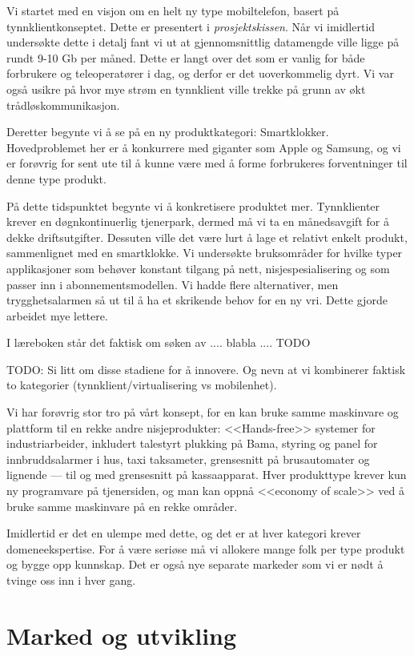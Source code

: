 Vi startet med en visjon om en helt ny type mobiltelefon, basert på
tynnklientkonseptet. Dette er presentert i \textit{prosjektskissen}. Når vi
imidlertid undersøkte dette i detalj fant vi ut at gjennomsnittlig datamengde
ville ligge på rundt 9-10 Gb per måned. Dette er langt over det som er vanlig
for både forbrukere og teleoperatører i dag, og derfor er det uoverkommelig
dyrt. Vi var også usikre på hvor mye strøm en tynnklient ville trekke på grunn
av økt trådløskommunikasjon.

Deretter begynte vi å se på en ny produktkategori: Smartklokker. Hovedproblemet
her er å konkurrere med giganter som Apple og Samsung, og vi er forøvrig for
sent ute til å kunne være med å forme forbrukeres forventninger til denne type
produkt.

På dette tidspunktet begynte vi å konkretisere produktet mer. Tynnklienter
krever en døgnkontinuerlig tjenerpark, dermed må vi ta en månedsavgift for å
dekke driftsutgifter. Dessuten ville det være lurt å lage et relativt enkelt
produkt, sammenlignet med en smartklokke. Vi undersøkte bruksområder for hvilke
typer applikasjoner som behøver konstant tilgang på nett, nisjespesialisering og som passer inn i
abonnementsmodellen. Vi hadde flere alternativer, men trygghetsalarmen så ut
til å ha et skrikende behov for en ny vri. Dette gjorde arbeidet mye lettere.

I læreboken står det faktisk om søken av .... blabla .... TODO

TODO: Si litt om disse stadiene for å innovere. Og nevn at vi kombinerer
faktisk to kategorier (tynnklient/virtualisering vs mobilenhet).

Vi har forøvrig stor tro på vårt konsept, for en kan bruke samme maskinvare og
plattform til en rekke andre nisjeprodukter: <<Hands-free>> systemer for
industriarbeider, inkludert talestyrt plukking på Bama, styring og panel for
innbruddsalarmer i hus, taxi taksameter, grensesnitt på brusautomater og
lignende --- til og med grensesnitt på kassaapparat.  Hver produkttype krever
kun ny programvare på tjenersiden, og man kan oppnå <<economy of scale>> ved å
bruke samme maskinvare på en rekke områder.

Imidlertid er det en ulempe med dette, og det er at hver kategori krever
domeneekspertise. For å være seriøse må vi allokere mange folk per type produkt
og bygge opp kunnskap. Det er også nye separate markeder som vi er nødt å
tvinge oss inn i hver gang.


\section{Marked og utvikling}
\label{marked}

